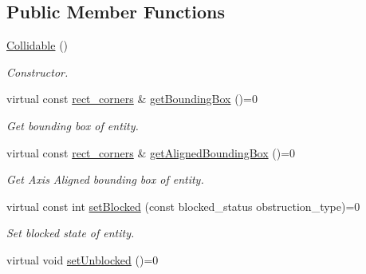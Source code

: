 \subsection*{Public Member Functions}
\begin{DoxyCompactItemize}
\item 
\hypertarget{class_collidable_a92ce9e2b08086bb2f466168ffc69c9ed}{\hyperlink{class_collidable_a92ce9e2b08086bb2f466168ffc69c9ed}{Collidable} ()}\label{class_collidable_a92ce9e2b08086bb2f466168ffc69c9ed}

\begin{DoxyCompactList}\small\item\em Constructor. \end{DoxyCompactList}\item 
\hypertarget{class_collidable_a3436effdcd9bea230f4a1aa32b8dd8ab}{virtual const \hyperlink{structrect__corners}{rect\+\_\+corners} \& \hyperlink{class_collidable_a3436effdcd9bea230f4a1aa32b8dd8ab}{get\+Bounding\+Box} ()=0}\label{class_collidable_a3436effdcd9bea230f4a1aa32b8dd8ab}

\begin{DoxyCompactList}\small\item\em Get bounding box of entity. \end{DoxyCompactList}\item 
\hypertarget{class_collidable_a6909df57a0915f044d5d967a3be086f3}{virtual const \hyperlink{structrect__corners}{rect\+\_\+corners} \& \hyperlink{class_collidable_a6909df57a0915f044d5d967a3be086f3}{get\+Aligned\+Bounding\+Box} ()=0}\label{class_collidable_a6909df57a0915f044d5d967a3be086f3}

\begin{DoxyCompactList}\small\item\em Get Axis Aligned bounding box of entity. \end{DoxyCompactList}\item 
\hypertarget{class_collidable_a6d312198ba82d26b5e360733bb87a2f0}{virtual const int \hyperlink{class_collidable_a6d312198ba82d26b5e360733bb87a2f0}{set\+Blocked} (const blocked\+\_\+status obstruction\+\_\+type)=0}\label{class_collidable_a6d312198ba82d26b5e360733bb87a2f0}

\begin{DoxyCompactList}\small\item\em Set blocked state of entity. \end{DoxyCompactList}\item 
\hypertarget{class_collidable_a817d864d0640bc6bcb13bbecf14ddf31}{virtual void \hyperlink{class_collidable_a817d864d0640bc6bcb13bbecf14ddf31}{set\+Unblocked} ()=0}\label{class_collidable_a817d864d0640bc6bcb13bbecf14ddf31}


\end{DoxyCompactItemize}
